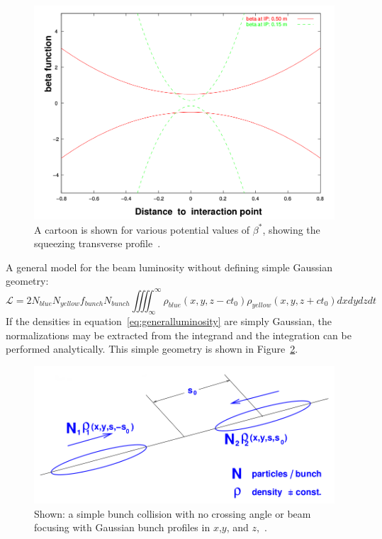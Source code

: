 \begin{figure}[h]
  \centering
  \includegraphics[width=0.8\linewidth]{./figures/beta_function.png}
  \caption{
    A cartoon is shown for various potential values of $\beta^*$, showing the
    squeezing transverse profile~\cite{Herr2003a}.
  }
  \label{fig:beta_squeeze}

\end{figure}

A general model for the beam luminosity without defining simple Gaussian
geometry:
\begin{equation}
\label{eq:generalluminosity}
\mathcal{L} = 2N_{blue}N_{yellow}f_{bunch}N_{bunch}\iiiint _{\infty}^{ \infty}{
\rho_{blue} (x,y,z-ct_0)\rho_{yellow} (x,y,z+ct_0)} dxdydzdt
\end{equation}
{\noindent}If the densities in equation~\ref{eq:generalluminosity} are simply
Gaussian, the normalizations may be extracted from the integrand and the
integration can be performed analytically. This simple geometry is shown in
Figure~\ref{fig:simple_bunch_xing}.

\begin{figure}
  \centering
  \includegraphics[width=0.75\linewidth]{./figures/simple_bunch_head_on.png}
  \caption{
    Shown: a simple bunch collision with no crossing angle or beam focusing with
    Gaussian bunch profiles in $x$,$y$, and $z$,~\cite{Herr2003a}.
  }
  \label{fig:simple_bunch_xing}
\end{figure}

